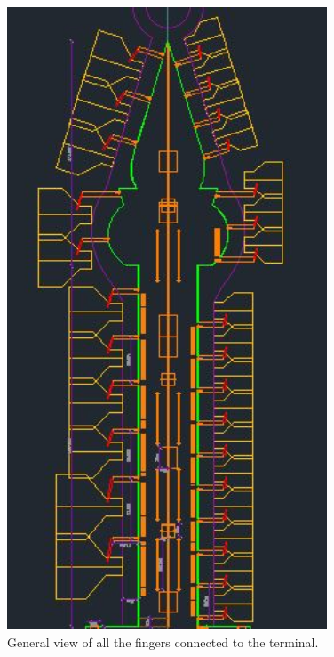 	\begin{figure}[H]
		\centering
		\includegraphics[clip, trim=0cm 0cm 0cm 0cm, angle=90, width=0.85\textwidth]{./images/serviceway/fingers}
		\caption{General view of all the fingers connected to the terminal.} %
		\label{} %
	\end{figure} 
	
